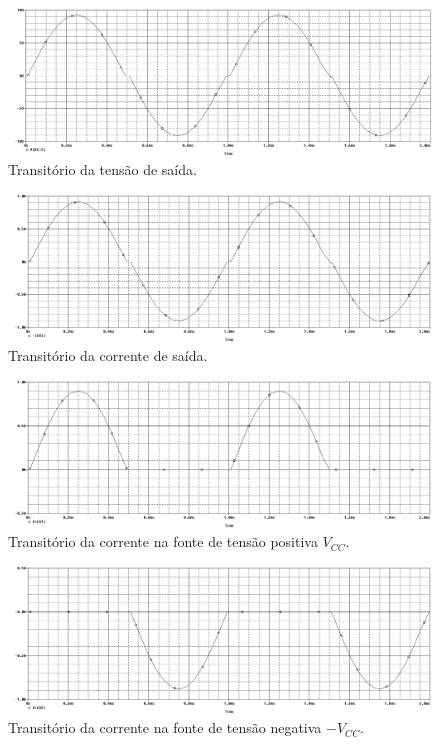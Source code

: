\documentclass[12pt, a4paper]{article}
\begin{document}
    \newpage
    
    \begin{figure}[h!] 
        \centering
        \includegraphics[width=1\textheight, angle=-90]{graf422V}
        \caption{Transitório da tensão de saída.}        
        \label{graf422V}
    \end{figure}
    
    \newpage
    
    \begin{figure}[h!] 
        \centering
        \includegraphics[width=1\textheight, angle=-90]{graf422I}
        \caption{Transitório da corrente de saída.}        
        \label{graf422I}
    \end{figure}
    
    \begin{figure}[h!] 
        \centering
        \includegraphics[width=1\textheight, angle=-90]{graf423I+}
        \caption{Transitório da corrente na fonte de tensão positiva
        \(V_{CC}\).}    
        \label{graf423I+}
    \end{figure}
    
    \newpage
    
    \begin{figure}[h!] 
        \centering
        \includegraphics[width=1\textheight, angle=-90]{graf423I-}
        \caption{Transitório da corrente na fonte de tensão negativa \(-V_{CC}\).}        
        \label{graf423I-}
    \end{figure}
    
\end{document}
